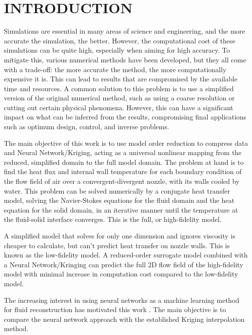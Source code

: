 \documentclass[10pt,fleqn,a4paper,twoside]{article}
\begin{document}
\section{INTRODUCTION}

Simulations are essential in many areas of science and engineering, and the more accurate the simulation, the better. However, the computational cost of these simulations can be quite high, especially when aiming for high accuracy. To mitigate this, various numerical methods have been developed, but they all come with a trade-off: the more accurate the method, the more computationally expensive it is. This can lead to results that are compromised by the available time and resources. A common solution to this problem is to use a simplified version of the original numerical method, such as using a coarse resolution or cutting out certain physical phenomena. However, this can have a significant impact on what can be inferred from the results, compromising final applications such as optimum design, control, and inverse problems.

The main objective of this work is to use model order reduction to compress data \citep{Hesthaven2016} and Neural Network\citep{Yu2019}/Kriging\citep{Ng2018}, acting as a universal nonlinear mapping from the reduced, simplified domain to the full model domain. The problem at hand is to find the heat flux and internal wall temperature for each boundary condition of the flow field of air over a convergent-divergent nozzle, with its walls cooled by water. This problem can be solved numerically by a conjugate heat transfer model, solving the Navier-Stokes equations for the fluid domain and the heat equation for the solid domain, in an iterative manner until the temperature at the fluid-solid interface converges. This is the full, or high-fidelity model.

A simplified model that solves for only one dimension and ignores viscosity is cheaper to calculate, but can't predict heat transfer on nozzle walls. This is known as the low-fidelity model. A reduced-order surrogate model combined with a Neural Network/Kringing can predict the full 2D flow field of the high-fidelity model with minimal increase in computation cost compared to the low-fidelity model.

The increasing interest in using neural networks as a machine learning method for fluid reconstruction has motivated this work \citep{Ozbay22,Ma2022,Dubois2022,Erichson2020}. The main objective is to compare the neural network approach with the established Kriging interpolation method.
\end{document}
